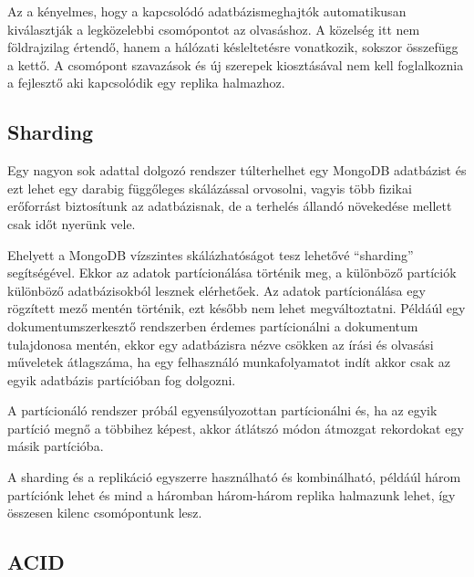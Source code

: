 Az a kényelmes, hogy a kapcsolódó adatbázismeghajtók automatikusan kiválasztják a legközelebbi csomópontot az olvasáshoz. A közelség itt nem földrajzilag értendő, hanem a hálózati késleltetésre vonatkozik, sokszor összefügg a kettő. A csomópont szavazások és új szerepek kiosztásával nem kell foglalkoznia a fejlesztő aki kapcsolódik egy replika halmazhoz. 

\subsection{Sharding}

Egy nagyon sok adattal dolgozó rendszer túlterhelhet egy MongoDB adatbázist és ezt lehet egy darabig függőleges skálázással orvosolni, vagyis több fizikai erőforrást biztosítunk az adatbázisnak, de a terhelés állandó növekedése mellett csak időt nyerünk vele. 

Ehelyett a MongoDB vízszintes skálázhatóságot tesz lehetővé ``sharding'' segítségével. Ekkor az adatok partícionálása történik meg, a különböző partíciók különböző adatbázisokból lesznek elérhetőek. Az adatok partícionálása egy rögzített mező mentén történik, ezt később nem lehet megváltoztatni. Példáúl egy dokumentumszerkesztő rendszerben érdemes partícionálni a dokumentum tulajdonosa mentén, ekkor egy adatbázisra nézve csökken az írási és olvasási műveletek átlagszáma, ha egy felhasználó munkafolyamatot indít akkor csak az egyik adatbázis partícióban fog dolgozni.

A partícionáló rendszer próbál egyensúlyozottan partícionálni és, ha az egyik partíció megnő a többihez képest, akkor átlátszó módon átmozgat rekordokat egy másik partícióba.

A sharding és a replikáció egyszerre használható és kombinálható, példáúl három partíciónk lehet és mind a háromban három-három replika halmazunk lehet, így összesen kilenc csomópontunk lesz.



\subsection{ACID}

